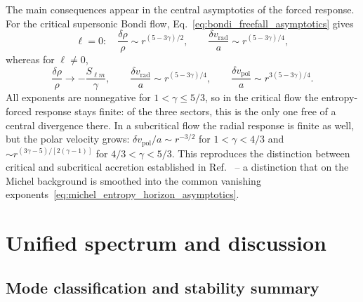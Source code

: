\documentclass[12pt,a4paper,preprint,nopreprintline]{elsarticle}
\begin{document}
The main consequences appear in the central asymptotics of the forced response. For the critical supersonic Bondi flow, Eq.~\eqref{eq:bondi_freefall_asymptotics} gives
\begin{equation}
    \ell=0:
    \quad
    \frac{\delta\rho}{\rho}
    \sim r^{(5-3\gamma)/2},
    \qquad
    \frac{\delta v_{\mathrm{rad}}}{a}
    \sim r^{(5-3\gamma)/4},
    \label{eq:entropy_critical_radial}
\end{equation}
whereas for $\ell\neq0$,
\begin{equation}
    \frac{\delta\rho}{\rho}
    \longrightarrow-\frac{S_{\ell m}}{\gamma},
    \qquad
    \frac{\delta v_{\mathrm{rad}}}{a}
    \sim r^{(5-3\gamma)/4},
    \qquad
    \frac{\delta v_{\mathrm{pol}}}{a}
    \sim r^{3(5-3\gamma)/4}.
    \label{eq:entropy_critical_nonradial}
\end{equation}
All exponents are nonnegative for $1<\gamma\leq5/3$, so in the critical flow the entropy-forced response stays finite: of the three sectors, this is the only one free of a central divergence there. In a subcritical flow the radial response is finite as well, but the polar velocity grows: $\delta v_{\mathrm{pol}}/a\sim r^{-3/2}$ for $1<\gamma<4/3$ and $\sim r^{(3\gamma-5)/[2(\gamma-1)]}$ for $4/3<\gamma<5/3$. This reproduces the distinction between critical and subcritical accretion established in Ref.~\cite{KovalenkoIG_EreminMA_SpatialInstabilityOfSphericalAccretion_1998} -- a distinction that on the Michel background is smoothed into the common vanishing exponents~\eqref{eq:michel_entropy_horizon_asymptotics}.

\section{Unified spectrum and discussion}
\label{sec:discussion}

\subsection{Mode classification and stability summary}
\label{sec:unified_classification}
\end{document}
